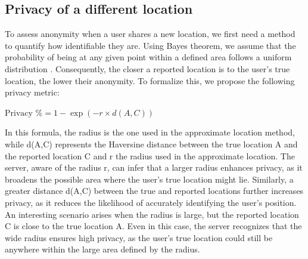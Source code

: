 \documentclass[9pt,conference]{IEEEtran}
\begin{document}
\subsection{Privacy of a different location}

To assess anonymity when a user shares a new location, we first need a method to quantify how identifiable they are. Using Bayes theorem, we assume that the probability of being at any given point within a defined area follows a uniform distribution \cite{lix}. Consequently, the closer a reported location is to the user’s true location, the lower their anonymity.
To formalize this, we propose the following privacy metric:

$\text{Privacy }\% = 1-\exp(-r \times d(A,C))$


In this formula, the radius is the one used in the approximate location method, while d(A,C) represents the Haversine distance \cite{Haversine} between the true location A and the reported location C and r the radius used in the approximate location.
The server, aware of the radius r, can infer that a larger radius enhances privacy, as it broadens the possible area where the user's true location might lie. Similarly, a greater distance d(A,C) between the true and reported locations further increases privacy, as it reduces the likelihood of accurately identifying the user's position.
An interesting scenario arises when the radius  is large, but the reported location C is close to the true location A. Even in this case, the server recognizes that the wide radius ensures high privacy, as the user's true location could still be anywhere within the large area defined by the radius.




\end{document}
